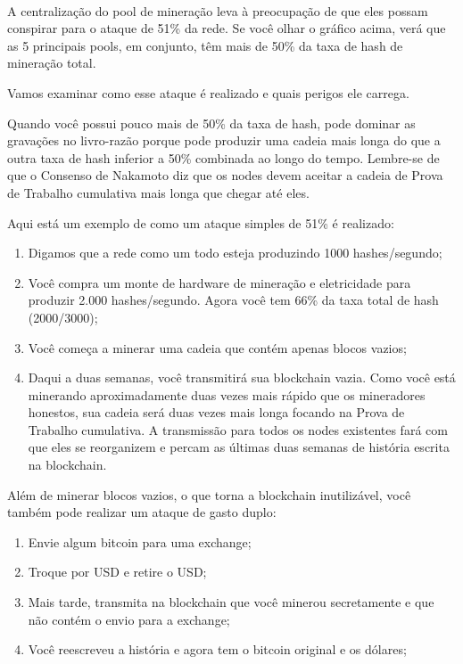 \paragraph{}

A centralização do pool de mineração leva à preocupação de que eles possam conspirar para o ataque de 51\% da rede. Se você olhar o gráfico acima, verá que as 5 principais pools, em conjunto, têm mais de 50\% da taxa de hash de mineração total.

Vamos examinar como esse ataque é realizado e quais perigos ele carrega.

Quando você possui pouco mais de 50\% da taxa de hash, pode dominar as gravações no livro-razão porque pode produzir uma cadeia mais longa do que a outra taxa de hash inferior a 50\% combinada ao longo do tempo. Lembre-se de que o Consenso de Nakamoto diz que os nodes devem aceitar a cadeia de Prova de Trabalho cumulativa mais longa que chegar até eles.

Aqui está um exemplo de como um ataque simples de 51\% é realizado:

\begin{enumerate}
\item Digamos que a rede como um todo esteja produzindo 1000 hashes/segundo;
\item Você compra um monte de hardware de mineração e eletricidade para produzir 2.000 hashes/segundo. Agora você tem 66\% da taxa total de hash (2000/3000);
\item Você começa a minerar uma cadeia que contém apenas blocos vazios;
\item Daqui a duas semanas, você transmitirá sua blockchain vazia. Como você está minerando aproximadamente duas vezes mais rápido que os mineradores honestos, sua cadeia será duas vezes mais longa focando na Prova de Trabalho cumulativa. A transmissão para todos os nodes existentes fará com que eles se reorganizem e percam as últimas duas semanas de história escrita na blockchain.
\end{enumerate}

Além de minerar blocos vazios, o que torna a blockchain inutilizável, você também pode realizar um ataque de gasto duplo:

\begin{enumerate}
\item Envie algum bitcoin para uma exchange;
\item Troque por USD e retire o USD;
\item Mais tarde, transmita na blockchain que você minerou secretamente e que não contém o envio para a exchange;
\item Você reescreveu a história e agora tem o bitcoin original e os dólares;
\end{enumerate}


